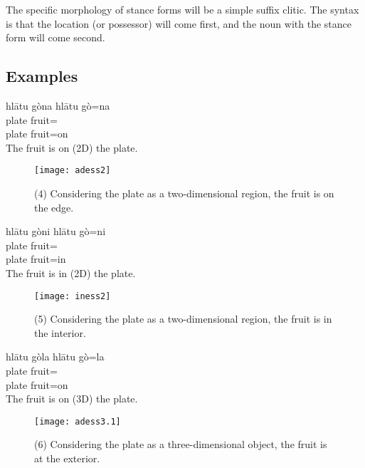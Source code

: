 The specific morphology of stance forms will be a simple suffix clitic.
The syntax is that the location (or possessor) will come first,
and the noun with the stance form will come second.

\newpage

\subsection{Examples}\label{subsec:examples2}

\begin{exe}
    \ex
    \glt
    hlātu gòna
    \glll
    hlātu gò=na \\
    plate fruit=\AdessTwo{} \\
    plate fruit=on \\
    \glt
    The fruit is on (2D) the plate.
\end{exe}

\begin{figure}[ht]
    \caption*{(4) Considering the plate as a two-dimensional region, the fruit is on the edge.}
    \centering
    \texttt{[image: adess2]}\label{fig:figure2}
\end{figure}

\begin{exe}
    \ex
    \glt
    hlātu gòni
    \glll
    hlātu gò=ni \\
    plate fruit=\InessTwo{} \\
    plate fruit=in \\
    \glt
    The fruit is in (2D) the plate.
\end{exe}

\begin{figure}[ht]
    \caption*{(5) Considering the plate as a two-dimensional region, the fruit is in the interior.}
    \centering
    \texttt{[image: iness2]}\label{fig:figure3}
\end{figure}

\newpage

\begin{exe}
    \ex
    \glt
    hlātu gòla
    \glll
    hlātu gò=la \\
    plate fruit=\AdessThree{} \\
    plate fruit=on \\
    \glt
    The fruit is on (3D) the plate.
\end{exe}

\begin{figure}[ht]
    \caption*{(6) Considering the plate as a three-dimensional object, the fruit is at the exterior.}
    \centering
    \texttt{[image: adess3.1]}\label{fig:figure4}
\end{figure}

